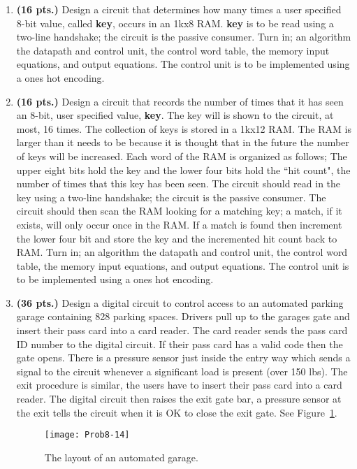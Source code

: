 \begin{enumerate}
    \item \textbf{ (16 pts.)}
        Design a circuit that determines how many times a user
        specified 8-bit value, called \textbf{ key}, occurs in an 1kx8 RAM.
        \textbf{ key} is to be read using a two-line handshake; the circuit
        is the passive consumer.
        Turn in; an algorithm the datapath and control unit, the control word
        table, the memory input equations, and output equations.
        The control unit is to be implemented using a ones hot encoding.

    \item \textbf{ (16 pts.)} Design a circuit that records the number of times that it
        has seen an 8-bit, user specified value, \textbf{ key}.  The key will
        is shown to the circuit, at most, 16 times.  The collection of
        keys is stored in a 1kx12 RAM.  The RAM is larger
        than it needs to be because it is thought that in the future
        the number of keys will be increased.  Each word of the RAM is
        organized as follows; The upper eight bits hold the key and the lower
        four bits hold the ``hit count", the number of times that this key has
        been seen.  The circuit should read in the key using a two-line
        handshake; the circuit is the passive consumer.  The circuit
        should then scan the RAM looking for a matching key; a match, if
        it exists, will only occur once in the RAM.  If a match is
        found then increment the lower four bit and store the key and the
        incremented hit count back to RAM.
        Turn in; an algorithm the datapath and control unit, the control word
        table, the memory input equations, and output equations.
        The control unit is to be implemented using a ones hot encoding.

    \item \textbf{ (36 pts.)}
        Design a digital circuit to control access to an
        automated parking garage containing 828 parking spaces.
        Drivers pull up to the garages gate and insert
        their pass card into a card reader.  The card reader sends the pass card
        ID number to the digital circuit.  If their pass card has a valid
        code then the gate opens.  There is a pressure sensor just inside the
        entry way which sends a signal to the circuit whenever a significant
        load is present (over 150 lbs).
        The exit procedure is similar, the users have to insert their pass card
        into a card reader.  The digital circuit then raises the exit gate bar,
        a pressure sensor at the exit tells the circuit when it is OK to close
        the exit gate.  See Figure~\ref{fig:Garage}.
        \begin{figure}[ht]
            \texttt{[image: Prob8-14]}
            \caption{The layout of an automated garage.}
            \label{fig:Garage}
        \end{figure}


\end{enumerate}
